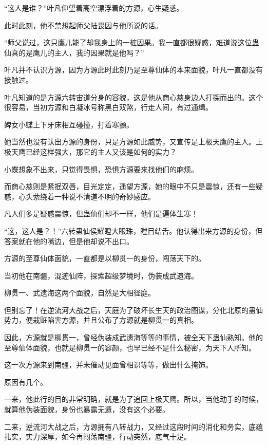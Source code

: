 
\begin{this_body}



“这人是谁？”叶凡仰望着高空漂浮着的方源，心生疑惑。

此时此刻，他不禁想起师父陆畏因与他所说的话。

“师父说过，这只鹰儿能了却我身上的一桩因果。我一直都很疑惑，难道说这位蛊仙真的是鹰儿的主人，我的因果就是他吗？”

叶凡并不认识方源，因为方源此时此刻乃是至尊仙体的本来面貌，叶凡一直都没有接触过。

叶凡知道的是方源六转宙道分身的容貌，这是他从商心慈身边人打探而出的。这个很容易，当初方源和白凝冰号称黑白双煞，行走人间，有过通缉。

婢女小蝶上下牙床相互碰撞，打着寒颤。

她当然也没有认出方源的身份，只是方源如此威势，又宣传是上极天鹰的主人。上极天鹰已经这样强大，那它的主人又该是如何的实力？

小蝶想象不出来，只觉得畏惧，恐惧方源要来找他们的麻烦。

而商心慈则是紧抿双唇，目光定定，遥望方源，她的眼中不只是震惊，还有一些疑惑，心头萦绕着一种说不清道不明的奇妙感应。

凡人们多是疑惑震惊，但蛊仙们却不一样，他们是遍体生寒！

“这，这人是？！”六转蛊仙侯耀瞪大眼珠，瞠目结舌。他认得出来方源的身份，但答案就在他的嘴边，但是他却说不出口。

方源的至尊仙体面貌，一直都是以柳贯一的身份，闯荡天下的。

当初他在南疆，混迹仙阵，探索超级梦境时，伪装成武遗海。

柳贯一、武遗海这两个面貌，自然是大相径庭。

但别忘了！在逆流河大战之后，天庭为了破坏长生天的政治图谋，分化北原的蛊仙势力，便栽赃陷害方源，并且公布了方源就是柳贯一的真相。

因此，方源就是柳贯一，曾经伪装成武遗海等等的事情，被全天下蛊仙熟知。他的至尊仙体面貌，也就是柳贯一的容颜，也早已经不是什么秘密，为天下人所知。

这一次方源来到南疆，并未催动见面曾相识等等，做出什么掩饰。

原因有几个。

一来，他此行的目的非常明确，就是为了追回上极天鹰。所以，当他动手的时候，就算他伪装面貌，身份也暴露无遗，没有这个必要。

二来，逆流河大战之后，方源拥有八转战力，又经过这段时间的消化和务实，底蕴扎实，实力深厚，如今再闯荡南疆，行动突然，底气十足。


\end{this_body}
